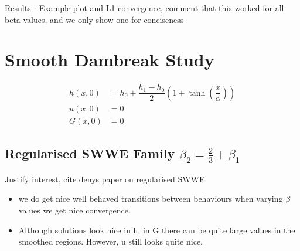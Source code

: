 \documentclass[10pt]{elsarticle}
\begin{document}
Results - Example plot and L1 convergence, comment that this worked for all beta values, and we only show one for conciseness


\section{Smooth Dambreak Study}
\begin{align}
h(x,0) & = h_0 + \dfrac{h_1 - h_0}{2} \left(1 + \tanh\left(\dfrac{x}{\alpha}\right)\right)  \\
u(x,0) &= 0 \\
G(x,0) &= 0
\end{align}


\subsection{Regularised SWWE Family $\beta_2 = \frac{2}{3} + \beta_1$}
Justify interest, cite denys paper on regularised SWWE


\begin{itemize}
	\item we do get nice well behaved transitions between behaviours when varying $\beta$ values
	we get nice convergence.
	\item Although solutions look nice in h, in G there can be quite large values in the smoothed regions. However, u still looks quite nice. 
\end{itemize}
\end{document}
